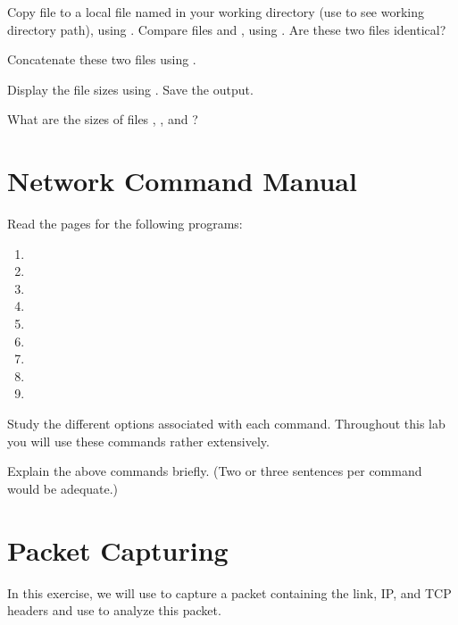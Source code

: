 \documentclass{../UTNetLab}
\begin{document}
Copy  file to a local file named  in your working directory (use  to see working directory path),
using .
Compare files  and , using .
Are these two files identical?

Concatenate these two files using .

Display the file sizes using .
Save the output.

\begin{report}
    \item What are the sizes of files , , and ?
\end{report}

\section{Network Command Manual}
Read the  pages for the following programs:
\begin{multicols}{3}
    \begin{enumerate}
        \item {}
        \item {}
        \item {}
        \item {}
        \item {}
        \item {}
        \item {}
        \item {}
        \item {}
    \end{enumerate}
\end{multicols}
Study the different options associated with each command.
Throughout this lab you will use these commands rather extensively.

\begin{report}
    \item Explain the above commands briefly.
    (Two or three sentences per command would be adequate.)
\end{report}

\section{Packet Capturing}
In this exercise, we will use  to capture a packet containing the link, IP, and TCP headers and use  to analyze this packet.
\end{document}
